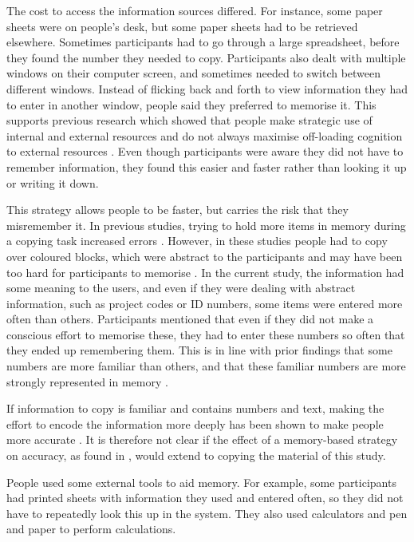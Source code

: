 \documentclass[11pt,oneside]{report}
\begin{document}
The cost to access the information sources differed. For instance, some paper sheets were on people's desk, but some paper sheets had to be retrieved elsewhere. Sometimes participants had to go through a large spreadsheet, before they found the number they needed to copy. Participants also dealt with multiple windows on their computer screen, and sometimes needed to switch between different windows. Instead of flicking back and forth to view information they had to enter in another window, people said they preferred to memorise it. This supports previous research which showed that people make strategic use of internal and external resources and do not always maximise off-loading cognition to external resources \citep{Gray2006}. Even though participants were aware they did not have to remember information, they found this easier and faster rather than looking it up or writing it down. 

This strategy allows people to be faster, but carries the risk that they misremember it. In previous studies, trying to hold more items in memory during a copying task increased errors \citep[e.g.][]{Morgan2009}. However, in these studies people had to copy over coloured blocks, which were abstract to the participants and may have been too hard for participants to memorise \citep{Waldron2011}. In the current study, the information had some meaning to the users, and even if they were dealing with abstract information, such as project codes or ID numbers, some items were entered more often than others. Participants mentioned that even if they did not make a conscious effort to memorise these, they had to enter these numbers so often that they ended up remembering them. This is in line with prior findings that some numbers are more familiar than others, and that these familiar numbers are more strongly represented in memory \citep{Wiseman2014}. 

If information to copy is familiar and contains numbers and text, making the effort to encode the information more deeply has been shown to make people more accurate \citep{Gray2004, Soboczenski2013}. It is therefore not clear if the effect of a memory-based strategy on accuracy, as found in \citep{Morgan2009}, would extend to copying the material of this study.

People used some external tools to aid memory. For example, some participants had printed sheets with information they used and entered often, so they did not have to repeatedly look this up in the system. They also used calculators and pen and paper to perform calculations.
\end{document}
